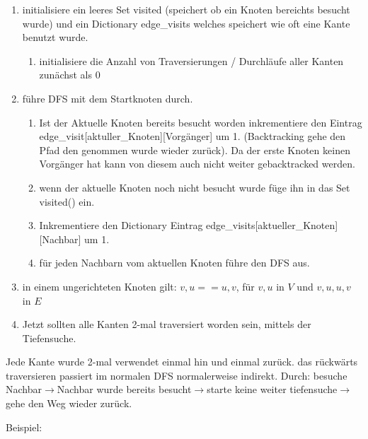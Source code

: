 \begin{enumerate}
	\item initialisiere ein leeres Set visited (speichert ob ein Knoten bereichts besucht wurde) und ein Dictionary edge\_visits{} welches speichert wie oft eine Kante benutzt wurde.
	\begin{enumerate}
		\item initialisiere die Anzahl von Traversierungen / Durchläufe aller Kanten zunächst als 0 
	\end{enumerate}
	
	\item führe DFS mit dem Startknoten durch.
	\begin{enumerate}
		\item Ist der Aktuelle Knoten bereits besucht worden inkrementiere den Eintrag edge\_visit[aktuller\_Knoten][Vorgänger] um 1. (Backtracking gehe den Pfad den genommen wurde wieder zurück). Da der erste Knoten keinen Vorgänger hat kann von diesem auch nicht weiter gebacktracked werden. 
		\item wenn der aktuelle Knoten noch nicht besucht wurde füge ihn in das Set visited() ein.
		\item Inkrementiere den Dictionary Eintrag edge\_visits[aktueller\_Knoten][Nachbar] um 1.
		\item für jeden Nachbarn vom aktuellen Knoten führe den DFS aus. 
	\end{enumerate}
	
	\item in einem ungerichteten Knoten gilt: ${v,u} == {u,v}$, für $v,u$ in $V$ und ${v,u},{u,v}$ in $E$
	\item Jetzt sollten alle Kanten 2-mal traversiert worden sein, mittels der Tiefensuche.
\end{enumerate}

Jede Kante wurde 2-mal verwendet einmal hin und einmal zurück. das rückwärts traversieren passiert im normalen DFS normalerweise indirekt. Durch: besuche Nachbar$\rightarrow$Nachbar wurde bereits besucht$\rightarrow$starte keine weiter tiefensuche$\rightarrow$gehe den Weg wieder zurück.

Beispiel:
\usetikzlibrary{arrows.meta, positioning}


